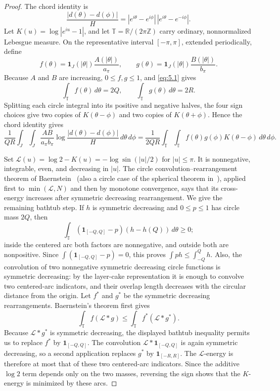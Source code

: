 \documentclass[11pt]{article}
\numberwithin{equation}{section}
\theoremstyle{plain}
\theoremstyle{definition}
\theoremstyle{remark}
\newcommand{\R}{\mathbb R}
\newcommand{\Z}{\mathbb Z}
\newcommand{\T}{\mathbb T}
\newcommand{\1}{\mathbf 1}
\newcommand{\dd}{\,d}
\begin{document}
\begin{proof}

The chord identity is
\[
 \frac{|d(\theta)-d(\phi)|}{H}
 =|e^{i\theta}-e^{i\phi}|\,|e^{i\theta}-e^{-i\phi}|.
\]
Let $K(u)=\log|e^{iu}-1|$, and let
$\T=\R/(2\pi\Z)$ carry ordinary, nonnormalized Lebesgue measure.  On the
representative interval $[-\pi,\pi]$, extended periodically, define
\[
 f(\theta)=\1_J(|\theta|)\frac{A(|\theta|)}{a_\pi},\qquad
 g(\theta)=\1_J(|\theta|)\frac{B(|\theta|)}{b_\pi}.
\]
Because $A$ and $B$ are increasing, $0\le f,g\le1$, and \eqref{eq:5.1} gives
\[
 \int_\T f(\theta)\dd\theta=2Q,\qquad
 \int_\T g(\theta)\dd\theta=2R.
\]
Splitting each circle integral into its positive and negative halves, the
four sign choices give two copies of $K(\theta-\phi)$ and two copies of
$K(\theta+\phi)$.  Hence the chord identity gives
\begin{equation}
 \frac1{QR}\int_J\int_J\frac{AB}{a_\pi b_\pi}
 \log\frac{|d(\theta)-d(\phi)|}{H}\dd\theta\dd\phi
 =\frac1{2QR}\int_\T\int_\T f(\theta)g(\phi)
 K(\theta-\phi)\dd\theta\dd\phi.
\label{eq:5.3}
\end{equation}

Set $\mathcal L(u)=\log2-K(u)=-\log\sin(|u|/2)$ for $|u|\le\pi$.
It is nonnegative, integrable, even, and decreasing in $|u|$.  The circle
convolution--rearrangement theorem of
Baernstein~\cite{Baernstein1989} (also a circle case of the spherical
theorem in~\cite{BaernsteinTaylor1976}), applied first to
$\min(\mathcal L,N)$ and then by monotone convergence, says that its
cross-energy increases after symmetric decreasing rearrangement.  We give
the remaining bathtub step.  If $h$ is symmetric decreasing and
$0\le p\le1$ has circle mass $2Q$, then
\[
 \int_\T(\1_{[-Q,Q]}-p)(h-h(Q))\dd\theta\ge0;
\]
inside the centered arc both factors are nonnegative, and outside both are
nonpositive.  Since $\int(\1_{[-Q,Q]}-p)=0$, this proves
$\int ph\le\int_{-Q}^Qh$.  Also, the convolution of two nonnegative
symmetric decreasing circle functions is symmetric decreasing: by the
layer-cake representation it is enough to convolve two centered-arc
indicators, and their overlap length decreases with the circular distance
from the origin.  Let $f^*$ and $g^*$ be the symmetric decreasing
rearrangements.  Baernstein's theorem first gives
\[
 \int_\T f(\mathcal L*g)\le
 \int_\T f^*(\mathcal L*g^*).
\]
Because $\mathcal L*g^*$ is symmetric decreasing, the displayed bathtub
inequality permits us to replace $f^*$ by $\1_{[-Q,Q]}$.  The convolution
$\mathcal L*\1_{[-Q,Q]}$ is again symmetric decreasing, so a second
application replaces $g^*$ by $\1_{[-R,R]}$.  The $\mathcal L$-energy is
therefore at most that of these two centered-arc indicators.  Since the
additive $\log2$
term depends only on the two masses, reversing the sign shows that the
$K$-energy is minimized by these arcs.


\end{proof}
\end{document}
